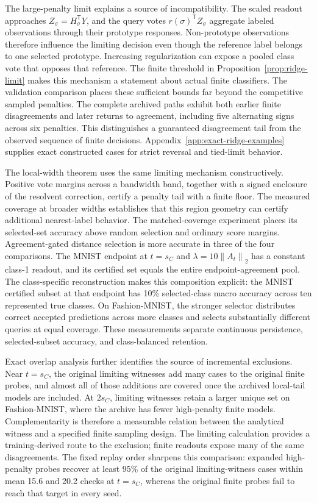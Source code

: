 \documentclass[preprint,12pt,authoryear]{elsarticle}
\newcommand{\norm}[1]{\left\lVert#1\right\rVert}
\newcommand{\tr}{\mathsf{T}}
\begin{document}
The large-penalty limit explains a source of incompatibility. The scaled readout approaches $Z_\sigma=H_\sigma^\tr Y$, and the query votes $r(\sigma)^\tr Z_\sigma$ aggregate labeled observations through their prototype responses. Non-prototype observations therefore influence the limiting decision even though the reference label belongs to one selected prototype. Increasing regularization can expose a pooled class vote that opposes that reference. The finite threshold in Proposition~\ref{prop:ridge-limit} makes this mechanism a statement about actual finite classifiers. The validation comparison places these sufficient bounds far beyond the competitive sampled penalties. The complete archived paths exhibit both earlier finite disagreements and later returns to agreement, including five alternating signs across six penalties. This distinguishes a guaranteed disagreement tail from the observed sequence of finite decisions. Appendix~\ref{app:exact-ridge-examples} supplies exact constructed cases for strict reversal and tied-limit behavior.

The local-width theorem uses the same limiting mechanism constructively. Positive vote margins across a bandwidth band, together with a signed enclosure of the resolvent correction, certify a penalty tail with a finite floor. The measured coverage at broader widths establishes that this region geometry can certify additional nearest-label behavior. The matched-coverage experiment places its selected-set accuracy above random selection and ordinary score margins. Agreement-gated distance selection is more accurate in three of the four comparisons. The MNIST endpoint at $t=s_C$ and $\lambda=10\norm{A_t}_2$ has a constant class-1 readout, and its certified set equals the entire endpoint-agreement pool. The class-specific reconstruction makes this composition explicit: the MNIST certified subset at that endpoint has 10\% selected-class macro accuracy across ten represented true classes. On Fashion-MNIST, the stronger selector distributes correct accepted predictions across more classes and selects substantially different queries at equal coverage. These measurements separate continuous persistence, selected-subset accuracy, and class-balanced retention.

Exact overlap analysis further identifies the source of incremental exclusions. Near $t=s_C$, the original limiting witnesses add many cases to the original finite probes, and almost all of those additions are covered once the archived local-tail models are included. At $2s_C$, limiting witnesses retain a larger unique set on Fashion-MNIST, where the archive has fewer high-penalty finite models. Complementarity is therefore a measurable relation between the analytical witness and a specified finite sampling design. The limiting calculation provides a training-derived route to the exclusion; finite readouts expose many of the same disagreements. The fixed replay order sharpens this comparison: expanded high-penalty probes recover at least 95\% of the original limiting-witness cases within mean 15.6 and 20.2 checks at $t=s_C$, whereas the original finite probes fail to reach that target in every seed.
\end{document}
